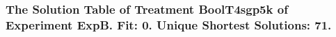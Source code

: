  \begin{frame}
 \fontsize{8pt}{9pt}\selectfont
 \frametitle{ The Solution Table of Treatment BoolT4sgp5k of Experiment ExpB. Fit: 0. Unique Shortest Solutions: 71. }

 \label{ExpBSolutionTable023.tex}  
 \end{frame}

